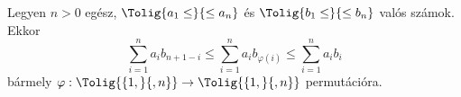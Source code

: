 Legyen $n>0$ egész, $\Tolig{a_{1}\le}{\le a_{n}}$ és $\Tolig{b_{1}\le}{\le b_{n}}$ 
valós számok. Ekkor 
$$
\sum_{i=1}^{n} a_{i}b_{n+1-i} \le \sum_{i=1}^{n} a_{i}b_{\varphi(i)} \le \sum_{i=1}^{n} a_{i}b_{i}
$$
bármely $\varphi:\Tolig{\{1,}{,n\}}\to\Tolig{\{1,}{,n\}}$ permutációra.


